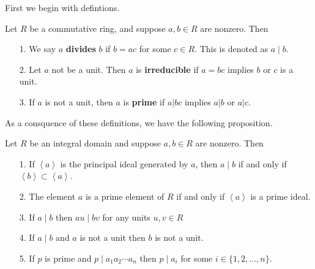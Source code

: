 \documentclass[12pt,letterpaper]{algebra_book}
\theoremstyle{definition}
\begin{document}
First we begin with defintions. 

\begin{definition}
Let $R$ be a commutative ring, and suppose $a, b \in R$ are
nonzero. Then 
\begin{itemize}
    \item [1.] We say $a$ \textbf{divides} $b$ if $b = ac$ for
    some $c \in R$. This is denoted as $a\mid b$.
    \item [2.] Let $a$ not be a unit. Then $a$ is \textbf{irreducible} if $a = bc$
    implies $b$ or $c$ is a unit. 
    \item [3.] If $a$ is not a unit, then $a$ is \textbf{prime} if
    $a | bc$ implies $a|b$ or $a | c$. 
\end{itemize}
\end{definition}

As a consquence of these definitions, we have the following
proposition. 
\begin{proposition} 
Let $R$ be an integral domain and suppose $a, b \in R$ are
nonzero. Then 
\begin{itemize}
    \item[1.] If $\left< a \right>$ is the principal ideal
    generated by $a$, then $a \mid b$ if and only if $\left< b
    \right> \subset \left< a \right>$. 

    \item[2.] The element $a$ is a prime element of $R$ if and
    only if $\left< a \right>$ is a prime ideal.

    \item[3.] If $a \mid b$ then $au \mid bv$ for any units $u,v
    \in R$ 

    \item[4.] If $a \mid b$ and $a$ is not a unit then $b$ is not
    a unit. 

    \item[5.] If $p$ is prime and $p \mid a_1a_2\cdots a_n$ then
    $p \mid a_i$ for some $i \in \{1, 2, \dots, n\}$.
\end{itemize}
\end{proposition}
\end{document}
